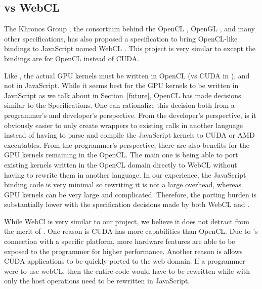 
\subsection{\name vs WebCL}
\label{webCLDisc}
The Khronos Group \cite{khronos}, the consortium behind the OpenCL
\cite{openCL}, OpenGL \cite{openGL}, and many other specifications, has also
proposed a specification to bring OpenCL-like bindings to JavaScript named WebCL
\cite{webCL}. This project is very similar to \name except the bindings are for
OpenCL instead of CUDA.

Like \namens, the actual GPU kernels must be written in OpenCL (vs CUDA in
\namens), and not in JavaScript. While it seems best for the GPU kernels to be
written in JavaScript as we talk about in Section~\ref{future}, OpenCL has made
decisions similar to the \name Specifications. One can rationalize this decision
both from a programmer's and developer's perspective. From the developer's
perspective, is it obviously easier to only create wrappers to existing calls in
another language instead of having to parse and compile the JavaScript kernels
to CUDA or AMD executables. From the programmer's perspective, there are also
benefits for the GPU kernels remaining in the OpenCL. The main one is being able
to port existing kernels written in the OpenCL domain directly to WebCL without
having to rewrite them in another language. In our experience, the JavaScript
binding code is very minimal so rewriting it is not a large overhead, whereas
GPU kernels can be very large and complicated. Therefore, the porting burden is
substantially lower with the specification decisions made by both WebCL and
\namens.

While WebCl is very similar to our project, we believe it does not detract from
the merit of \namens. One reason is CUDA has more capabilities than OpenCL. Due
to \namens's connection with a specific platform, more hardware features are able to
be exposed to the programmer for higher performance. Another reason is \name
allows CUDA applications to be quickly ported to the web domain. If a programmer
were to use webCL, then the entire code would have to be rewritten while with
\name only the host operations need to be rewritten in JavaScript.

